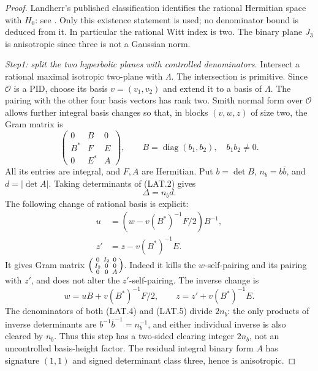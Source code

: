 \begin{proof}
Landherr's published classification identifies the rational
Hermitian space with $H_0$: see \cite[p.~246 for the invariants,
first paragraph of p.~247 for their completeness]{E8LAT:Landherr}.
Only this existence statement is used; no denominator bound is
deduced from it.  In particular the rational Witt index is two.
The binary plane $J_3$ is anisotropic since three is not a
Gaussian norm.

\emph{Step1: split the two hyperbolic planes with controlled
denominators.}  Intersect a rational maximal isotropic two-plane
with $\Lambda$.  The intersection is primitive.  Since
$\mathcal O$ is a PID, choose its basis $v=(v_1,v_2)$ and extend
it to a basis of $\Lambda$.  The pairing with the other four
basis vectors has rank two.  Smith normal form over $\mathcal O$
allows further integral basis changes so that, in blocks
$(v,w,z)$ of size two, the Gram matrix is
\[
 \begin{pmatrix}
 0&B&0\\ B^*&F&E\\0&E^*&A
 \end{pmatrix},\qquad
             B=\operatorname{diag}(b_1,b_2),\quad b_1b_2\ne0.
                                                                  \tag{LAT.2}
\]
All its entries are integral, and $F,A$ are Hermitian.  Put
$b=\det B$, $n_b=b\overline b$, and $d=|\det A|$.  Taking
determinants of (LAT.2) gives
\[
                   \Delta=n_b d.                            \tag{LAT.3}
\]
The following change of rational basis is explicit:
\[
 \begin{split}
 u&=\left(w-v(B^*)^{-1}F/2\right)B^{-1},\\
 z'&=z-v(B^*)^{-1}E.
 \end{split}                                                   \tag{LAT.4}
\]
It gives Gram matrix $\begin{psmallmatrix}0&I_2&0\\I_2&0&0\\0&0&A\end{psmallmatrix}$.
Indeed it kills the $w$-self-pairing and its pairing with $z'$,
and does not alter the $z'$-self-pairing.  The inverse change is
\[
             w=uB+v(B^*)^{-1}F/2,
             \qquad z=z'+v(B^*)^{-1}E.                        \tag{LAT.5}
\]
The denominators of both (LAT.4) and (LAT.5) divide $2n_b$:
the only products of inverse determinants are
$b^{-1}\overline b^{-1}=n_b^{-1}$, and either individual inverse
is also cleared by $n_b$.  Thus this step has a two-sided
clearing integer $2n_b$, not an uncontrolled basis-height
factor.  The residual integral binary form $A$ has signature
$(1,1)$ and signed determinant class three, hence is anisotropic.


\end{proof}
